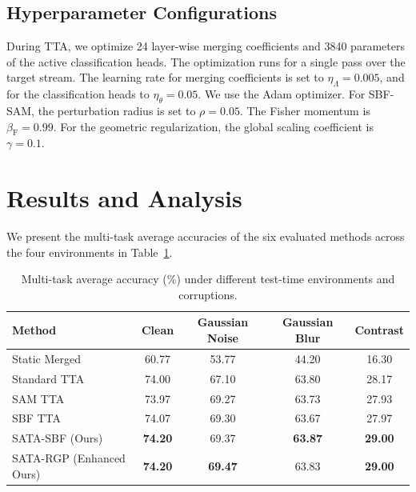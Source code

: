 \documentclass{article}
\begin{document}
\subsection{Hyperparameter Configurations}
During TTA, we optimize 24 layer-wise merging coefficients and 3840 parameters of the active classification heads. The optimization runs for a single pass over the target stream. The learning rate for merging coefficients is set to $\eta_{\Lambda} = 0.005$, and for the classification heads to $\eta_{\theta} = 0.05$. We use the Adam optimizer. For SBF-SAM, the perturbation radius is set to $\rho = 0.05$. The Fisher momentum is $\beta_{\text{F}} = 0.99$. For the geometric regularization, the global scaling coefficient is $\gamma = 0.1$.

\section{Results and Analysis}
\label{sec:results}

We present the multi-task average accuracies of the six evaluated methods across the four environments in Table~\ref{tab:results}.

\begin{table}[t]
\caption{Multi-task average accuracy (\%) under different test-time environments and corruptions.}
\label{tab:results}
\vskip 0.15in
\begin{center}
\begin{small}
\begin{tabular}{lcccc}
\toprule
\textbf{Method} & \textbf{Clean} & \textbf{Gaussian Noise} & \textbf{Gaussian Blur} & \textbf{Contrast} \\
\midrule
Static Merged & 60.77 & 53.77 & 44.20 & 16.30 \\
Standard TTA & 74.00 & 67.10 & 63.80 & 28.17 \\
SAM TTA & 73.97 & 69.27 & 63.73 & 27.93 \\
SBF TTA & 74.07 & 69.30 & 63.67 & 27.97 \\
SATA-SBF (Ours) & \textbf{74.20} & 69.37 & \textbf{63.87} & \textbf{29.00} \\
SATA-RGP (Enhanced Ours) & \textbf{74.20} & \textbf{69.47} & 63.83 & \textbf{29.00} \\
\bottomrule
\end{tabular}
\end{small}
\end{center}
\vskip -0.1in
\end{table}
\end{document}
